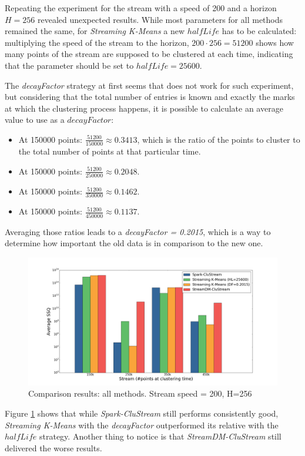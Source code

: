 Repeating the experiment for the stream with a speed of 200 and a horizon $H=256$ revealed unexpected results. While most parameters for all methods remained the same, for \textit{Streaming K-Means} a new $halfLife$ has to be calculated: multiplying the speed of the stream to the horizon, $200\cdot 256=51200$ shows how many points of the stream are supposed to be clustered at each time, indicating that the parameter should be set to $halfLife=25600$. 


The \textit{decayFactor} strategy at first seems that does not work for such experiment, but considering that the total number of entries is known and exactly the marks at which the clustering process happens, it is possible to calculate an average value to use as a $decayFactor$: 

\begin{itemize}
 \item At 150000 points: $\frac{51200}{150000} \approx 0.3413$, which is the ratio of the points to cluster to the total number of points at that particular time.
 \item At 150000 points: $\frac{51200}{250000} \approx 0.2048$.
 \item At 150000 points: $\frac{51200}{350000} \approx 0.1462$.
 \item At 150000 points: $\frac{51200}{450000} \approx 0.1137$.
\end{itemize}

Averaging those ratios leads to a \textit{decayFactor = 0.2015}, which is a way to determine how important the old data is in comparison to the new one.

\begin{figure}[h!]
 \centering
 \includegraphics[scale=0.16]{./styles/comparison200.png}
 \caption{Comparison results: all methods. Stream speed = 200, H=256}
 \label{fig:comparison200}
\end{figure}

Figure \ref{fig:comparison200} shows that while \textit{Spark-CluStream} still performs consistently good, \textit{Streaming K-Means} with the \textit{decayFactor} outperformed its relative with the $halfLife$ strategy. Another thing to notice is that \textit{StreamDM-CluStream} still delivered the worse results. 


